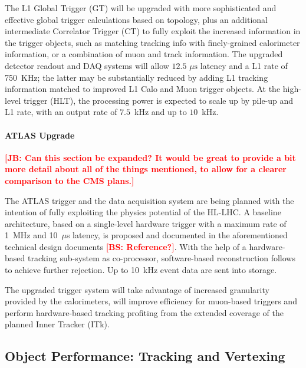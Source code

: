 The L1 Global Trigger (GT) will be upgraded with more sophisticated and effective global trigger calculations based on topology, plus an additional intermediate Correlator Trigger (CT) to fully exploit the increased information in the trigger objects, such as matching tracking info with finely-grained calorimeter information, or a combination of muon and track information. The upgraded detector readout and DAQ systems will allow $12.5\,\, \mu \mathrm{s}$ latency and a L1 rate of 750~KHz; the latter may be substantially reduced by adding L1 tracking information matched to improved L1 Calo and Muon trigger objects. At the high-level trigger (HLT), the processing power is expected to scale up by pile-up and L1 rate, with an output rate of $7.5$~kHz and up to $10$~kHz. 

\paragraph{ATLAS Upgrade}

{\bf \textcolor{red}{[JB: Can this section be expanded?  It would be great to provide a bit more detail about all of the things mentioned, to allow for a clearer comparison to the CMS plans.]}}

\noindent {\bf \textcolor{red}{[BS: ATLAS L0 — it is mentioned earlier in the paper but it is not mentioned in the trigger section.]}}

\noindent {\bf \textcolor{red}{[BS: ATLAS FTK doesn’t seem to be mentioned at all?]}}

The ATLAS trigger and the data acquisition system are being planned with the intention of fully exploiting the physics potential of the HL-LHC. A baseline architecture, based on a single-level hardware trigger with a maximum rate of 1~MHz and 10~$\mu$s latency, is proposed and documented in the aforementioned technical design documents {\bf \textcolor{red}{[BS: Reference?]}}. With the help of a hardware-based tracking sub-system as co-processor, software-based reconstruction follows to achieve further rejection. Up to 10~kHz event data are sent into storage.

The upgraded trigger system will take advantage of increased granularity provided by the calorimeters, will improve efficiency for muon-based triggers and perform hardware-based tracking profiting from the extended coverage of the planned Inner Tracker (ITk). 

\subsection{Object Performance: Tracking and Vertexing} \label{sec:upgradeobject}

